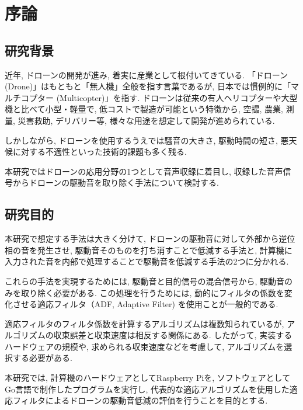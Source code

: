 \chapter{序論}\label{introduction}

\section{研究背景}\label{research-background}

近年, ドローンの開発が進み, 着実に産業として根付いてきている. 
「ドローン (Drone)」はもともと「無人機」全般を指す言葉であるが, 日本では慣例的に「マルチコプター (Multicopter)」を指す. 
ドローンは従来の有人ヘリコプターや大型機と比べて小型・軽量で, 低コストで製造が可能という特徴から, 空撮, 農業, 測量, 災害救助, デリバリー等, 様々な用途を想定して開発が進められている. 

しかしながら, ドローンを使用するうえでは騒音の大きさ, 駆動時間の短さ, 悪天候に対する不適性といった技術的課題も多く残る. 

本研究ではドローンの応用分野の1つとして音声収録に着目し, 収録した音声信号からドローンの駆動音を取り除く手法について検討する. 

\newpage

\section{研究目的}\label{ux7814ux7a76ux76eeux7684}

本研究で想定する手法は大きく分けて, ドローンの駆動音に対して外部から逆位相の音を発生させ, 駆動音そのものを打ち消すことで低減する手法と, 計算機に入力された音を内部で処理することで駆動音を低減する手法の2つに分かれる. 

これらの手法を実現するためには, 駆動音と目的信号の混合信号から, 駆動音のみを取り除く必要がある. この処理を行うためには, 動的にフィルタの係数を変化させる適応フィルタ（ADF, Adaptive
Filter) を使用ことが一般的である. 

適応フィルタのフィルタ係数を計算するアルゴリズムは複数知られているが, アルゴリズムの収束誤差と収束速度は相反する関係にある. したがって, 実装するハードウェアの規模や, 求められる収束速度などを考慮して, アルゴリズムを選択する必要がある. 

本研究では, 計算機のハードウェアとしてRaspberry Piを, ソフトウェアとしてGo言語で制作したプログラムを実行し, 代表的な適応アルゴリズムを使用した適応フィルタによるドローンの駆動音低減の評価を行うことを目的とする. 
